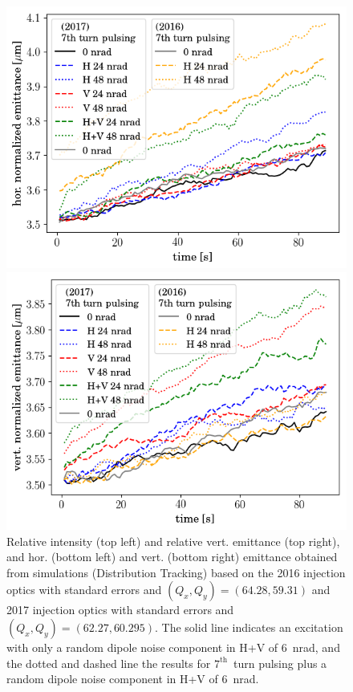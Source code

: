 \documentclass[%
 reprint,
 amsmath,amssymb,
 aps,
prstab,
]{revtex4-1}
\begin{document}
\begin{figure}[h]
\begin{minipage}[t]{0.49\linewidth}
		\includegraphics[width=1.0\linewidth]{2016+2017injerra2b2uran1_2e-3_7th_3_5um_emit1.png}
	\end{minipage}	
	\begin{minipage}[t]{0.49\linewidth}
		\centering
		\includegraphics[width=1.0\linewidth]{2016+2017injerra2b2uran1_2e-3_7th_3_5um_emit2.png}
	\end{minipage}
	\caption{\label{fig:7thsim} Relative intensity (top left) and relative vert. emittance (top right), and hor. (bottom left) and vert. (bottom right) emittance obtained from simulations (Distribution Tracking) based on the 2016 injection optics with standard errors and $(Q_x,Q_y)=(64.28,59.31)$ and 2017 injection optics with standard errors and $(Q_x,Q_y)=(62.27,60.295)$. The solid line indicates an excitation with only a random dipole noise component in H+V of 6~nrad, and the dotted and dashed line the results for $7^{\mathrm{th}}$~turn pulsing plus a random dipole noise component in H+V of 6~nrad.}
\end{figure}
\end{document}

